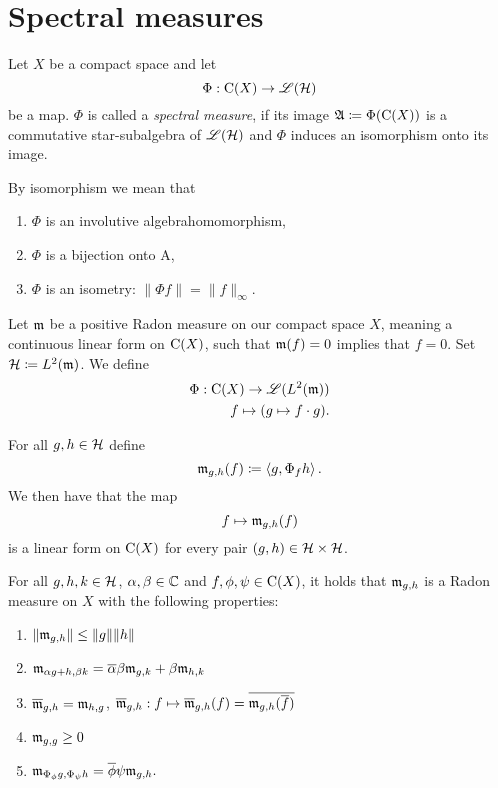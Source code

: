 
\section{Spectral measures}

\begin{defi}
 
 Let $X$ be a compact space and let
 \[
  \Phi : \operatorname{C} (X) \to \mathscr{L}(\mathcal{H})
 \]
be a map. $\Phi$ is called a \textit{spectral measure}, if its image 
$\mathfrak{A} \coloneqq \Phi(\operatorname{C} (X))$ is a commutative star-subalgebra of $\mathscr{L}(\mathcal{H})$ and 
$\Phi$ induces an isomorphism onto its image.
\end{defi}

\begin{rem}
 By isomorphism we mean that
 \begin{enumerate}
  \item $\Phi$ is an involutive algebrahomomorphism,
  \item $\Phi$ is a bijection onto A,
  \item $\Phi$ is an isometry: $\| \Phi f \| = \| f \|_\infty$.
 \end{enumerate}

\end{rem}


Let $\mathfrak{m}$ be a positive Radon measure on our compact space $X$, meaning a
continuous linear form on $\operatorname{C} (X)$, such that $\mathfrak{m}(f) = 0$ implies that $f=0$. Set $\mathcal{H} \coloneqq L^2(\mathfrak{m})$.
We define 
\begin{align*}
 \Phi : \operatorname{C}(X) \to \mathscr{L}({L^2(\mathfrak{m})}) \\
 f \mapsto (g \mapsto f\cdot g).
\end{align*}

For all $g , h \in \mathcal{H}$ define
\[
 \mathfrak{m}_{g, h} (f) \coloneqq \left\langle g, \Phi_f h \right\rangle.
\]
We then have that the map 
\[
 f \mapsto \mathfrak{m}_{g,h} (f)
\]
is a linear form on $\operatorname{C} (X)$ for every pair $(g, h) \in \mathcal{H} \times \mathcal{H}$.

\begin{thrm}
For all $g, h,k \in \mathcal{H}$, $\alpha, \beta \in \mathbb{C}$ and $f, \phi, \psi \in 
\operatorname{C}(X)$, it holds that $\mathfrak{m}_{g,h}$ is a Radon measure on $X$ with the following 
properties:
\begin{enumerate}[{(}i{)}]
 \item $\| \mathfrak{m}_{g,h}\| \leq \|g\| \|h\|$
 \item $\mathfrak{m}_{\alpha g + h, \beta k} = \overline{\alpha}\beta \mathfrak{m}_{g,k} + 
 \beta \mathfrak{m}_{h,k}$
 \item $\overline{\mathfrak{m}}_{g,h} = \mathfrak{m}_{h,g}$, $\overline{\mathfrak{m}}_{g,h} : 
 f \mapsto \overline{\mathfrak{m}}_{g,h}(f) = \overline{\mathfrak{m}_{g,h}(\overline{f})}$
 \item $\mathfrak{m}_{g,g} \geq 0$
 \item $\mathfrak{m}_{\Phi_\phi g, \Phi_\psi h} = \overline{\phi} \psi \mathfrak{m}_{g,h}.$
\end{enumerate}

\end{thrm}

